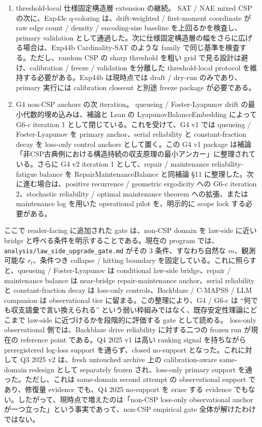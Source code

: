 \documentclass[12pt,a4paper]{article}
\begin{document}
\begin{enumerate}
\def\labelenumi{\arabic{enumi}.}
\item
  threshold-local 仕様固定構造層 extension の継続。 SAT / NAE mixed CSP の次に、Exp43c q-coloring は、drift-weighted / first-moment coordinate が raw edge count / density / encoding-size baseline を上回るかを検査し、primary validation として通過した。次に仕様固定構造層の幅をさらに広げる場合は、Exp44b Cardinality-SAT のような family で同じ基準を検査する。ただし、random CSP の sharp threshold を粗い grid で見る設計は避け、calibration / freeze / validation を分離した threshold-local protocol を維持する必要がある。Exp44b は現時点では draft / dry-run のみであり、primary 実行には calibration closeout と別途 freeze package が必要である。
\item
  G4 non-CSP anchors の次 iteration。 queueing / Foster-Lyapunov drift の最小代数的埋め込みは、補論と Lean の LyapunovBalanceEmbedding によって G6-c iteration 1 として閉じている。これを受けて、G4 v1 では queueing / Foster-Lyapunov を primary anchor、serial reliability と constant-fraction decay を loss-only control anchors として置く。この G4 v1 package は補論「非CSP古典例における構造持続の収支原理の最小アンカー」に整理されている。さらに G4 v2 iteration 1 として、repair / maintenance reliability-fatigue balance を RepairMaintenanceBalance と同補論 §11 に整理した。次に進む場合は、positive recurrence / geometric ergodicity への G6-c iteration 2、stochastic reliability / optimal maintenance theorem への拡張、または maintenance log を用いた operational pilot を、明示的に scope lock する必要がある。
\end{enumerate}

ここで reader-facing に追加された gate は、non-CSP domain を law-side に近い bridge と呼べる条件を明示することである。現在の program では、\texttt{analysis/law\_side\_upgrade\_gate.md} がその 3 条件、すなわち自然な \(m\)、観測可能な \(r_{t}\)、条件つき collapse / hitting boundary を固定している。これに照らすと、queueing / Foster-Lyapunov は conditional law-side bridge、repair / maintenance balance は near-bridge repair-maintenance anchor、serial reliability と constant-fraction decay は loss-only controls、Backblaze / C-MAPSS / LLM companion は observational tier に留まる。この整理により、G4 / G6-c は ``何でも収支語彙で言い換えられる'' という弱い枠組みではなく、既存安定性理論にどこまで law-side に近づけるかを段階的に評価する gate として読める。 loss-only observational 側では、Backblaze drive reliability に対する二つの frozen run が現在の reference point である。Q4 2025 v1 は高い ranking signal を持ちながら preregistered log-loss support を通らず、closed no-support となった。これに対して Q3 2025 v2 は、fresh untouched archive 上の calibration-aware same-domain redesign として separately frozen され、loss-only primary support を通った。ただし、これは same-domain second attempt の observational support であり、修復量 evidence でも、Q4 2025 no-support を erase する evidence でもない。したがって、現時点で増えたのは「non-CSP loss-only observational anchor が一つ立った」という事実であって、non-CSP empirical gate 全体が解けたわけではない。
\end{document}
